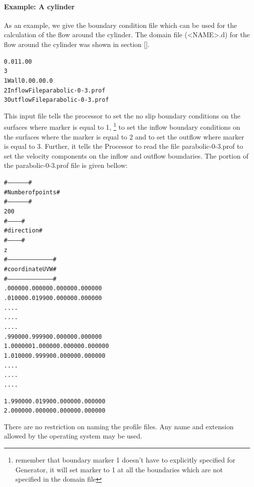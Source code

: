 \documentclass[10pt]{article}
\newcommand*{\tc}{\ttfamily} %
\newcommand*{\tn}{\sffamily} %
\begin{document}
    \paragraph{Example: A cylinder}
    As an example, we give the boundary condition file which
    can be used for the calculation of the flow around the
    cylinder. The domain file ({\tc <NAME>.d}) for the flow
    around the cylinder was shown in section [].
    \small
    \begin{alltt}
     0.01  1.00
      3
      1         Wall         0.0      0.0   0.0
      2         Inflow   File  parabolic-0-3.prof
       3        Outflow  File  parabolic-0-3.prof
    \end{alltt}
    \normalsize
    This input file tells the processor to set the no slip 
    boundary conditions on the
    surfaces where marker is equal to 1,
    \footnote{remember that boundary marker 1 doesn't have to
              explicitly specified for {\tn Generator}, it will
              set marker to 1 at all the boundaries which are 
              not specified in the domain file}
    to set the inflow boundary conditions on the surfaces where
    the marker is equal to 2 and to set the outflow where marker
    is equal to 3. Further, it tells the {\tn Processor} to read
    the file {\tc parabolic-0-3.prof} to set the velocity components
    on the inflow and outflow boundaries. 
    The portion of the {\tc parabolic-0-3.prof} file is given
    bellow:
    \small
    \begin{alltt}
    #------------------#
    # Number of points #
    #------------------#
     200
    #-----------#
    # direction #
    #-----------#
     z
    #---------------------------------------#
    # coordinate U         V         W      #
    #---------------------------------------#
     .000000     .000000   .000000   .000000
     .010000     .019900   .000000   .000000
     .           .         .         .
     .           .         .         .
     .           .         .         .
     .990000     .999900   .000000   .000000
    1.000000    1.000000   .000000   .000000
    1.010000     .999900   .000000   .000000
     .           .         .         .
     .           .         .         .
     .           .         .         .

    1.990000     .019900   .000000   .000000
    2.000000     .000000   .000000   .000000
    \end{alltt}
    \normalsize
    There are no restriction on naming the profile files. Any
    name and extension allowed by the operating system
    may be used.
\end{document}
